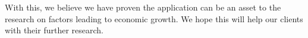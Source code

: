 With this, we believe we have proven the application can be an asset to the research on factors leading to economic growth. We hope this will help our clients with their further research. 




